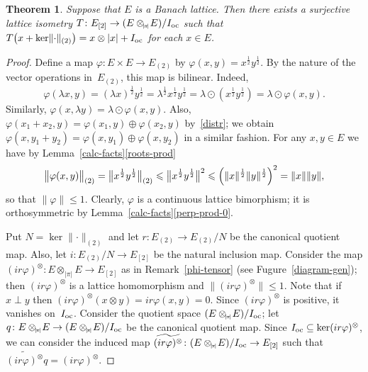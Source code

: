 \documentclass[12pt]{amsart}
\theoremstyle{plain}
\newtheorem{theorem}{Theorem}
\theoremstyle{definition}
\newcommand{\abs}[1]{\lvert#1\rvert}
\newcommand{\norm}[1]{\lVert#1\rVert}
\newcommand{\bignorm}[1]{\bigl\lVert#1\bigr\rVert}
\renewcommand{\le}{\leqslant}
\def\api{{\abs{\!\pi\!}}}
\def\ftp{\otimes_{\!\scriptscriptstyle\api}\!}
\def\xyroot{x^{\frac{1}{2}}{y^{\frac{1}{2}}}}
\def\Ioc{I_{\rm oc}}
\begin{document}
\begin{theorem}\label{general-gen}
  Suppose that $E$ is a Banach lattice. Then there exists a surjective
  lattice isometry $T\colon E_{[2]}\to(E\ftp E)/\Ioc$ such that
  $T\bigl(x+\ker\norm{\cdot}_{(2)}\bigr)=x\otimes\abs{x}+\Ioc$ for
  each $x\in E$.
\end{theorem}

\begin{proof}
  Define a map $\varphi\colon E\times E\to E_{(2)}$ by
  $\varphi(x,y)=\xyroot$. By the nature of the vector
  operations in~$E_{(2)}$, this map is bilinear. Indeed,
  \[
    \varphi(\lambda x,y)=(\lambda x)^{\frac{1}{2}}y^{\frac{1}{2}}
      =\lambda^{\frac{1}{2}}\xyroot
      =\lambda\odot(\xyroot)
      =\lambda\odot \varphi(x,y).
  \]  
  Similarly, $\varphi(x,\lambda y)=\lambda\odot \varphi(x,y)$. Also,
  $\varphi(x_1+x_2,y)=\varphi(x_1,y)\oplus \varphi(x_2,y)$ by~\eqref{distr}; we obtain
  $\varphi(x,y_1+y_2)=\varphi(x,y_1)\oplus \varphi(x,y_2)$ in a similar fashion.  For
  any $x,y\in E$ we have by Lemma~\ref{calc-facts}\eqref{roots-prod}
  \[
    \bignorm{\varphi(x,y)}_{(2)}=\bignorm{\xyroot}_{(2)}
     \le \bignorm{\xyroot}^2
     \le \Bigl(\norm{x}^{\frac{1}{2}}\norm{y}^{\frac{1}{2}}\Bigr)^2
     =\norm{x}\norm{y},
  \]
  so that $\norm{\varphi}\le 1$. Clearly, $\varphi$ is a continuous
  lattice bimorphism; it is orthosymmetric by
  Lemma~\ref{calc-facts}\eqref{perp-prod-0}.

  Put $N=\ker\norm{\cdot}_{(2)}$ and let $r\colon E_{(2)}\to
  E_{(2)}/N$ be the canonical quotient map. Also, let $i\colon E_{(2)}/N\to
  E_{[2]}$ be the natural inclusion map. Consider the map
  $(ir\varphi)^\otimes\colon E\ftp E\to E_{[2]}$ as in
  Remark~\ref{phi-tensor} (see Fugure~\ref{diagram-gen}); then
  $(ir\varphi)^\otimes$ is a lattice homomorphism and
  $\norm{(ir\varphi)^\otimes}\le 1$.  Note that if $x\perp y$ then
  $(ir\varphi)^\otimes(x\otimes y)=ir\varphi(x,y)=0$.  Since
  $(ir\varphi)^\otimes$ is positive, it vanishes on~$\Ioc$. Consider
  the quotient space $(E\ftp E)/\Ioc$; let
  \begin{math}
  q\colon E\ftp E\to(E\ftp E)/\Ioc  
  \end{math}
  be the canonical
  quotient map.  Since $\Ioc\subseteq\ker(ir\varphi)^\otimes$, we can
  consider the induced map $\widetilde{(ir\varphi)^\otimes}\colon
  (E\ftp E)/\Ioc\to E_{[2]}$ such that
  \begin{math}
    \widetilde{(ir\varphi)^\otimes}q=(ir\varphi)^\otimes.
  \end{math}


\end{proof}
\end{document}
